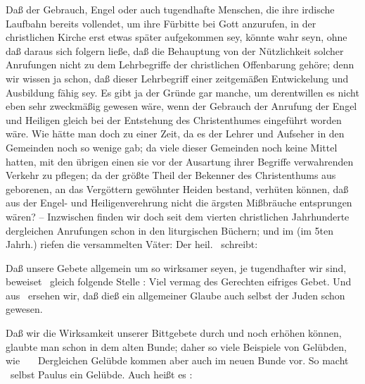 \begin{aufza}
\item Daß der Gebrauch, Engel oder auch tugendhafte Menschen, die ihre irdische Laufbahn bereits vollendet, um ihre Fürbitte bei Gott anzurufen, in der christlichen Kirche erst etwas später aufgekommen sey, könnte wahr seyn, ohne daß daraus sich folgern ließe, daß die Behauptung von der Nützlichkeit solcher Anrufungen nicht zu dem Lehrbegriffe der christlichen Offenbarung gehöre; denn wir wissen ja schon, daß dieser Lehrbegriff einer zeitgemäßen Entwickelung und Ausbildung fähig sey. Es gibt ja der Gründe gar manche, um derentwillen es nicht eben sehr zweckmäßig gewesen wäre, wenn der Gebrauch der Anrufung der Engel und Heiligen gleich bei der Entstehung des Christenthumes eingeführt worden wäre. Wie hätte man doch zu einer Zeit, da es der Lehrer und Aufseher in den Gemeinden noch so wenige gab; da viele dieser Gemeinden noch keine Mittel hatten, mit den übrigen einen sie vor der Ausartung ihrer Begriffe verwahrenden Verkehr zu pflegen; da der größte Theil der Bekenner des Christenthums aus geborenen, an das Vergöttern gewöhnter Heiden bestand, verhüten können, daß aus der Engel- und Heiligenverehrung nicht die ärgsten Mißbräuche entsprungen wären? -- Inzwischen finden wir doch seit dem vierten christlichen Jahrhunderte dergleichen Anrufungen schon in den liturgischen Büchern; und im  (im 5ten Jahrh.) riefen die versammelten Väter:  Der heil.\   schreibt:  \usw\
\item Daß unsere Gebete allgemein um so wirksamer seyen, je tugendhafter wir sind, beweiset \zB\ gleich folgende Stelle : Viel vermag des Gerechten eifriges Gebet. Und aus \ ersehen wir, daß dieß ein allgemeiner Glaube auch selbst der Juden schon gewesen.~
\item Daß wir die Wirksamkeit unserer Bittgebete durch \RWbet{gute Werke} und \RWbet{Gelübde} noch erhöhen können, glaubte man schon in dem alten Bunde; daher so viele Beispiele von Gelübden, wie \RWbibel{Gen}{1\,Mos.}{28}{20}\ \RWbibel{1\,Sam}{1\,Sam.}{1}{21}\ \uma\  Dergleichen Gelübde kommen aber auch im neuen Bunde vor. So macht \ selbst Paulus ein Gelübde. Auch heißt es : 

\end{aufza}
